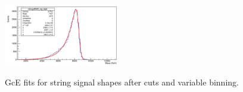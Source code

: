 \begin{figure}[!htb]
{  \includegraphics[width=0.45\textwidth]{figures/app-StrMorphShapeStudies/GcEFit_New_ntuples_8p5TeV.png} }
  \caption{GcE fits for string signal shapes after cuts and variable binning.}
  \label{fig:ReceGcE}
\end{figure}

\clearpage

